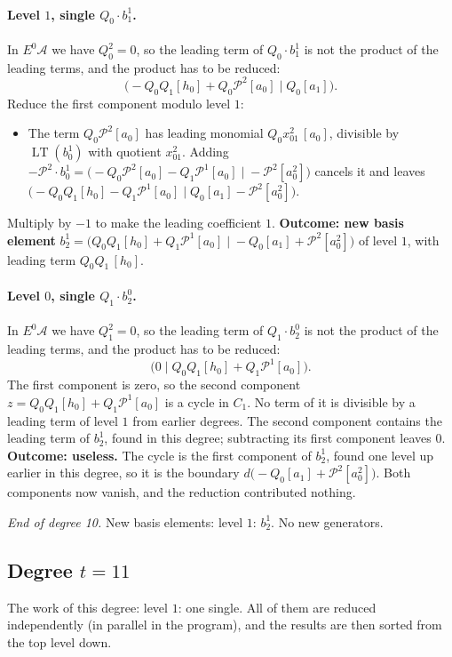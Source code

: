 \documentclass[11pt]{article}
\renewcommand{\P}{\mathcal{P}}
\newcommand{\A}{\mathcal{A}}
\DeclareMathOperator{\LT}{LT}
\begin{document}
\paragraph{Level $1$, single $Q_{0}\cdot b^{1}_{1}$.} In $E^0\A$ we have $Q_{0}^2 = 0$, so the leading term of $Q_{0}\cdot b^{1}_{1}$ is not the product of the leading terms, and the product has to be reduced:
\[\bigl(-Q_{0}Q_{1}[h_0] + Q_{0}\P^{2}[a_0] \;\big|\; Q_{0}[a_1]\bigr).\]
Reduce the first component modulo level $1$:
\begin{itemize}
\item The term $Q_{0}\P^{2}[a_0]$ has leading monomial $Q_{0}x_{01}^{2}\,[a_0]$, divisible by $\LT(b^{1}_{0})$ with quotient $x_{01}^{2}$. Adding $-\P^{2}\cdot b^{1}_{0} = \bigl(-Q_{0}\P^{2}[a_0] - Q_{1}\P^{1}[a_0] \;\big|\; -\P^{2}[a_0^2]\bigr)$ cancels it and leaves $\bigl(-Q_{0}Q_{1}[h_0] - Q_{1}\P^{1}[a_0] \;\big|\; Q_{0}[a_1] - \P^{2}[a_0^2]\bigr)$.
\end{itemize}
Multiply by $-1$ to make the leading coefficient $1$.
\textbf{Outcome: new basis element} $b^{1}_{2} = \bigl(Q_{0}Q_{1}[h_0] + Q_{1}\P^{1}[a_0] \;\big|\; -Q_{0}[a_1] + \P^{2}[a_0^2]\bigr)$ of level $1$, with leading term $Q_{0}Q_{1}\,[h_0]$.
\medskip
\paragraph{Level $0$, single $Q_{1}\cdot b^{0}_{2}$.} In $E^0\A$ we have $Q_{1}^2 = 0$, so the leading term of $Q_{1}\cdot b^{0}_{2}$ is not the product of the leading terms, and the product has to be reduced:
\[\bigl(0 \;\big|\; Q_{0}Q_{1}[h_0] + Q_{1}\P^{1}[a_0]\bigr).\]
The first component is zero, so the second component $z = Q_{0}Q_{1}[h_0] + Q_{1}\P^{1}[a_0]$ is a cycle in $C_{1}$.
No term of it is divisible by a leading term of level $1$ from earlier degrees.
The second component contains the leading term of $b^{1}_{2}$, found in this degree; subtracting its first component leaves $0$.
\textbf{Outcome: useless.} The cycle is the first component of $b^{1}_{2}$, found one level up earlier in this degree, so it is the boundary $d\bigl(-Q_{0}[a_1] + \P^{2}[a_0^2]\bigr)$. Both components now vanish, and the reduction contributed nothing.
\medskip
\par\noindent\emph{End of degree 10.} New basis elements: level $1$: $b^{1}_{2}$. No new generators.
\subsection*{Degree $t = 11$}
\noindent The work of this degree: level $1$: one single. All of them are reduced independently (in parallel in the program), and the results are then sorted from the top level down.
\medskip
\end{document}
